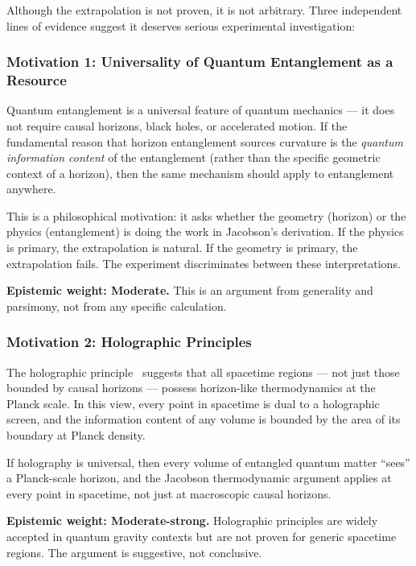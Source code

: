Although the extrapolation is not proven, it is not arbitrary. Three
independent lines of evidence suggest it deserves serious experimental
investigation:

\subsubsection{Motivation 1: Universality of Quantum Entanglement as a
Resource}

Quantum entanglement is a universal feature of quantum mechanics ---
it does not require causal horizons, black holes, or accelerated motion.
If the fundamental reason that horizon entanglement sources curvature is
the \emph{quantum information content} of the entanglement (rather than
the specific geometric context of a horizon), then the same mechanism
should apply to entanglement anywhere.

This is a philosophical motivation: it asks whether the geometry (horizon)
or the physics (entanglement) is doing the work in Jacobson's derivation.
If the physics is primary, the extrapolation is natural. If the geometry
is primary, the extrapolation fails. The experiment discriminates between
these interpretations.

\textbf{Epistemic weight: Moderate.} This is an argument from generality
and parsimony, not from any specific calculation.

\subsubsection{Motivation 2: Holographic Principles}

The holographic principle~\cite{susskind1995,bousso2002} suggests that
all spacetime regions --- not just those bounded by causal horizons ---
possess horizon-like thermodynamics at the Planck scale. In this view,
every point in spacetime is dual to a holographic screen, and the
information content of any volume is bounded by the area of its boundary
at Planck density.

If holography is universal, then every volume of entangled quantum matter
``sees'' a Planck-scale horizon, and the Jacobson thermodynamic argument
applies at every point in spacetime, not just at macroscopic causal horizons.

\textbf{Epistemic weight: Moderate-strong.} Holographic principles are
widely accepted in quantum gravity contexts but are not proven for generic
spacetime regions. The argument is suggestive, not conclusive.

